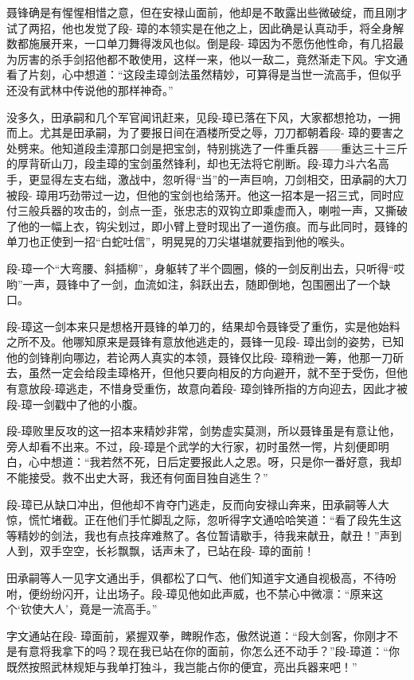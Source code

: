 \documentclass[12pt,oneside]{book}
\begin{document}
聂锋确是有惺惺相惜之意，但在安禄山面前，他却是不敢露出些微破绽，而且刚才试了两招，他也发觉了段-
璋的本领实是在他之上，因此确是认真动手，将全身解数都施展开来，一口单刀舞得泼风也似。倒是段-
璋因为不愿伤他性命，有几招最为厉害的杀手剑招他都不敢使用，这样一来，他以一敌二，竟然渐走下风。宇文通看了片刻，心中想道：``这段圭璋剑法虽然精妙，可算得是当世一流高手，但似乎还没有武林中传说他的那样神奇。''

没多久，田承嗣和几个军官闻讯赶来，见段-璋已落在下风，大家都想抢功，一拥而上。尤其是田承嗣，为了要报日间在酒楼所受之辱，刀刀都朝着段-
璋的要害之处劈来。他知道段圭漳那口剑是把宝剑，特别挑选了一件重兵器------重达三十三斤的厚背斫山刀，段圭璋的宝剑虽然锋利，却也无法将它削断。段-璋力斗六名高手，更显得左支右绌，激战中，忽听得``当''的一声巨响，刀剑相交，田承嗣的大刀被段-
璋用巧劲带过一边，但他的宝剑也给荡开。他这一招本是一招三式，同时应付三般兵器的攻击的，剑点一歪，张忠志的双钩立即乘虚而入，喇啦一声，又撕破了他的一幅上衣，钩尖划过，即小臂上登时现出了一道伤痕。而与此同时，聂锋的单刀也正使到一招``白蛇吐信''，明晃晃的刀尖堪堪就要指到他的喉头。

段-璋一个``大弯腰、斜插柳''，身躯转了半个圆圈，倏的一剑反削出去，只听得``哎哟''一声，聂锋中了一剑，血流如注，斜跃出去，随即倒地，包围圈出了一个缺口。

段-璋这一剑本来只是想格开聂锋的单刀的，结果却令聂锋受了重伤，实是他始料之所不及。他哪知原来是聂锋有意放他逃走的，聂锋一见段-
璋出剑的姿势，已知他的剑锋削向哪边，若论两人真实的本领，聂锋仅比段-
璋稍逊一筹，他那一刀斫去，虽然一定会给段圭璋格开，但他只要向相反的方向避开，就不至于受伤，但他有意放段-璋逃走，不惜身受重伤，故意向着段-
璋剑锋所指的方向迎去，因此才被段-璋一剑戳中了他的小腹。

段-璋败里反攻的这一招本来精妙非常，剑势虚实莫测，所以聂锋虽是有意让他，旁人却看不出来。不过，段-璋是个武学的大行家，初时虽然一愕，片刻便即明白，心中想道：``我若然不死，日后定要报此人之恩。呀，只是你一番好意，我却不能接受。救不出史大哥，我还有何面目独自逃生？''

段-璋已从缺口冲出，但他却不肯夺门逃走，反而向安禄山奔来，田承嗣等人大惊，慌忙堵截。正在他们手忙脚乱之际，忽听得字文通哈哈笑道：``看了段先生这等精妙的剑法，我也有点技痒难熬了。各位暂请歇手，待我来献丑，献丑！''声到人到，双手空空，长衫飘飘，话声未了，已站在段-
璋的面前！

田承嗣等人一见字文通出手，俱都松了口气、他们知道宇文通自视极高，不待吩咐，便纷纷闪开，让出场子。段-璋见他如此声威，也不禁心中微凛：``原来这个`钦使大人'，竟是一流高手。''

字文通站在段-
璋面前，紧握双拳，睥睨作态，傲然说道：``段大剑客，你刚才不是有意将我拿下的吗？现在我已站在你的面前，你怎么还不动手？''段-璋道：``你既然按照武林规矩与我单打独斗，我岂能占你的便宜，亮出兵器来吧！''
\end{document}
